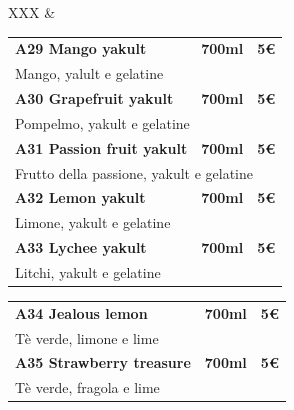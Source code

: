 \documentclass[hidelinks,10pt,a4paper]{article}
\newcommand{\mybox}[1]{
		\colorbox{square}{
		\begin{minipage}{0.97\linewidth}
			#1
		\end{minipage}
	}
}
\newcommand{\entryThreeDesc}[4]{
{\vspace*{-0.5mm}\textbf{\small{#1}}}&{\vspace*{-0.5mm}\textbf{\small{#3}}}&{\vspace*{-0.5mm}\textbf{\small{#4}}}\\
 \multicolumn{3}{l}{\textcolor{desc}{\footnotesize{#2}}} \\
}
\begin{document}
\begin{landscape}
\begin{tabularx}{\linewidth}{XXX}
{		
		}&{
			\vspace*{0.1cm}
			\mybox{
			\begin{tabular*}{\linewidth}{ l l l }
				\entryThreeDesc{A29 Mango yakult}{Mango, yalult e gelatine}{\hspace*{8mm}700ml}{\hspace*{10mm}5€}
				\entryThreeDesc{A30 Grapefruit yakult}{Pompelmo, yakult e gelatine}{\hspace*{8mm}700ml}{\hspace*{10mm}5€}
				\entryThreeDesc{A31 Passion fruit yakult}{Frutto della passione, yakult e gelatine}{\hspace*{8mm}700ml}{\hspace*{10mm}5€}
				\entryThreeDesc{A32 Lemon yakult}{Limone, yakult e gelatine}{\hspace*{8mm}700ml}{\hspace*{10mm}5€}
				\entryThreeDesc{A33 Lychee yakult}{Litchi, yakult e gelatine}{\hspace*{8mm}700ml}{\hspace*{10mm}5€}
			\end{tabular*}
			}
			
			\mybox{
				\begin{tabular*}{\linewidth}{ l l l }
					\entryThreeDesc{A34 Jealous lemon}{Tè verde, limone e lime}{\hspace*{7mm}700ml}{\hspace*{10mm}5€}
					\entryThreeDesc{A35 Strawberry treasure}{Tè verde, fragola e lime}{\hspace*{7mm}700ml}{\hspace*{10mm}5€}
				\end{tabular*}
			}
			
}
\end{tabularx}
\end{landscape}
\end{document}
